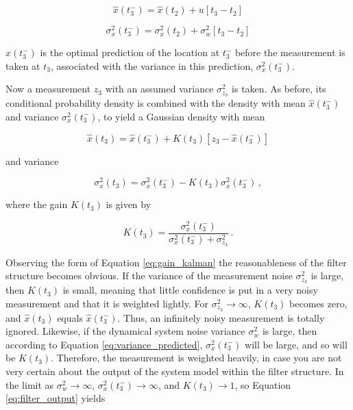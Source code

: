 \begin{equation}\label{eq:system_model}
  \hat{x}(t^-_3)=\hat{x}(t_2)+u[t_3-t_2]
\end{equation}

\begin{equation}\label{eq:variance_predicted}
  \sigma^2_x(t^-_3)=\sigma^2_x(t_2)+\sigma^2_w[t_3-t_2]
\end{equation}

\noindent
$\hat{x}(t^-_3)$ is the optimal prediction of the location at $t^-_3$ before the measurement is taken at $t_3$, associated with the variance in this prediction, $\sigma^2_x(t^-_3)$.

Now a measurement $z_3$ with an assumed variance $\sigma^2_{z_3}$ is taken. As before, its conditional probability density is combined with the density with mean $\hat{x}(t^-_3)$ and variance $\sigma^2_x(t^-_3)$, to yield a Gaussian density with mean

\begin{equation}\label{eq:estimation_kalman}
  \hat{x}(t_3) = \hat{x}(t^-_3) + K(t_3)[z_3-\hat{x}(t^-_3)]
\end{equation}

\noindent
and variance

\begin{equation}\label{eq:variance_kalman}
  \sigma^2_x(t_3) = \sigma^2_x(t^-_3)-K(t_3)\sigma^2_x(t^-_3)\,,
\end{equation}

\noindent
where the gain $K(t_3)$ is given by

\begin{equation}\label{eq:gain_kalman}
  K(t_3) = \frac{\sigma^2_x(t^-_3)}{\sigma^2_x(t^-_3)+\sigma^2_{z_3}}\,.
\end{equation}

Observing the form of Equation \ref{eq:gain_kalman} the reasonableness of the filter structure becomes obvious. If the variance of the measurement noise $\sigma^2_{z_3}$ is large, then $K(t_3)$ is small, meaning that little confidence is put in a very noisy measurement and that it is weighted lightly. For $\sigma^2_{z_3}\rightarrow\infty$, $K(t_3)$ becomes zero, and $\hat{x}(t_3)$ equals $\hat{x}(t^-_3)$. Thus, an infinitely noisy measurement is totally ignored. Likewise, if the dynamical system noise variance $\sigma^2_w$ is large, then according to Equation \ref{eq:variance_predicted}, $\sigma^2_x(t^-_3)$ will be large, and so will be $K(t_3)$. Therefore, the measurement is weighted heavily, in case you are not very certain about the output of the system model within the filter structure. In the limit as $\sigma^2_w \rightarrow\infty$, $\sigma^2_x(t^-_3) \rightarrow\infty$, and $K(t_3) \rightarrow1$, so Equation \ref{eq:filter_output} yields

